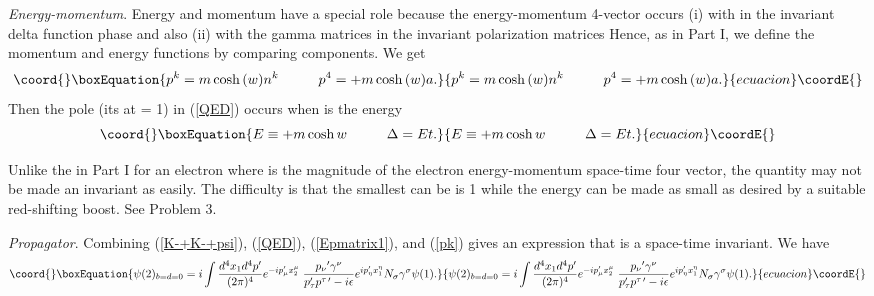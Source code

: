 \documentclass[a4paper,12pt]{article}
\begin{document}
	{\textit{Energy-momentum}}. Energy and momentum have a special role because the energy-momentum 4-vector occurs (i) with \coordHE{} in the invariant delta function phase \coordHE{} and also (ii) with the gamma matrices in the invariant polarization matrices \coordHE{} Hence, as in Part I, we define the momentum and energy functions by comparing components. We get
\begin{equation}\coord{}\boxEquation{ \label{pk}
p^{k} = m \cosh{(w)} n^{k} \hspace{1cm} p^{4} = + m\cosh{(w)} a .
}{ p^{k} = m \cosh{(w)} n^{k} \hspace{1cm} p^{4} = + m\cosh{(w)} a .
}{ecuacion}\coordE{}\end{equation}
Then the pole (its at \coordHE{} = 1) in (\ref{QED}) occurs when \coordHE{} is the energy \coordHE{}
\begin{equation}\coord{}\boxEquation{	\label{E}
E \equiv + m \cosh{w} \hspace{1cm} \Delta = E t.
}{	E \equiv + m \cosh{w} \hspace{1cm} \Delta = E t.
}{ecuacion}\coordE{}\end{equation} 

	Unlike the \coordHE{} in Part I for an electron where \coordHE{} is the magnitude of the electron energy-momentum space-time four vector, the quantity \coordHE{} may not be made an invariant as easily. The difficulty is that the smallest \coordHE{} can be is 1 while the energy \coordHE{} can be made as small as desired by a suitable red-shifting boost. See Problem 3.

	\coordHE{} {\textit{Propagator}}. Combining (\ref{K-+K-+psi}), (\ref{QED}), (\ref{Epmatrix1}), and (\ref{pk}) gives an expression that is a space-time invariant. We have 
\begin{equation}\coord{}\boxEquation{	\label{QEDnu1}
\psi(2)_{b=d=0} = i\int \frac{d^4 x_{1} d^4 p^{\prime} }{(2 \pi)^4} e^{-ip_{\mu}^{\prime}x_{2}^{\mu}} \; \frac{ {p_{\nu}}^{\prime} \gamma^{\nu} }{p_{\tau}^{\prime}p^{\tau \, \prime}- i\epsilon} e^{ip_{\eta}^{\prime}x_{1}^{\eta}}  N_{\sigma} \gamma^{\sigma} \psi(1).
}{	\psi(2)_{b=d=0} = i\int \frac{d^4 x_{1} d^4 p^{\prime} }{(2 \pi)^4} e^{-ip_{\mu}^{\prime}x_{2}^{\mu}} \; \frac{ {p_{\nu}}^{\prime} \gamma^{\nu} }{p_{\tau}^{\prime}p^{\tau \, \prime}- i\epsilon} e^{ip_{\eta}^{\prime}x_{1}^{\eta}}  N_{\sigma} \gamma^{\sigma} \psi(1).
}{ecuacion}\coordE{}\end{equation}
\end{document}
